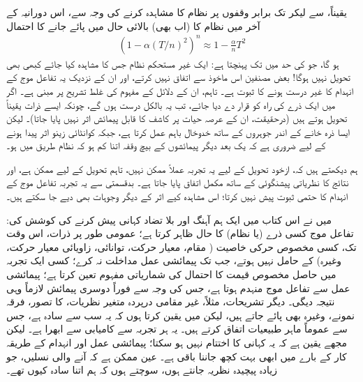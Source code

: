 یقیناً،  سے لیکر  تک  برابر وقفوں  پر نظام کا مشاہدہ کرنے کی وجہ سے، اس دورانیہ کے آخر میں نظام کا (اب بھی) بالائی حال میں پائے جانے کا احتمال 
\begin{align}
	\left(1-\alpha(T/n)^2\right)^n\approx1-\frac{\alpha}{n}T^2
\end{align}
ہو گا، جو  کی حد میں  تک پہنچتا ہے: ایک غیر مستحکم نظام جس کا  مشاہدہ کیا جائے کبھی بھی تحویل نہیں ہوگا! بعض مصنفین اس ماخوذ سے اتفاق نہیں کرتے، اور ان کے نزدیک یہ تفاعل موج کے انہدام کا غیر درست ہونے کا ثبوت ہے۔ تاہم، ان کے دلائل  کے مفہوم کی غلط تشریح پر مبنی ہے۔ اگر  میں ایک ذرے کی راہ کو  قرار دے دیا جائے، تب یہ بالکل درست ہوں گے، چونکہ ایسے ذرات یقیناً تحویل ہوتے ہیں (درحقیقت، ان کے عرصہ حیات پر کاشف کا قابل پیمائش اثر نہیں پایا جاتا)۔ لیکن ایسا ذرہ خانے کے اندر جوہروں کے ساتھ خدوخال باہم عمل کرتا ہے، جبکہ کوانٹائی زینو اثر پیدا ہونے کے لیے ضروری ہے کہ یک بعد دیگر پیمائشوں کے بیچ وقفہ اتنا کم ہو کہ نظام  طریق میں ہو۔

ہم دیکھتے ہیں کہ، ازخود تحویل کے لیے یہ تجربہ عملاً ممکن نہیں، تاہم  تحویل کے لیے ممکن ہے، اور نتائج کا نظریاتی پیشنگوئی کے ساتھ مکمل اتفاق پایا جاتا ہے۔ بدقسمتی سے یہ تجربہ تفاعل موج کے انہدام کا حتمی ثبوت پیش نہیں کرتا؛ اس مشاہدہ کیے اثر کے دیگر وجوہات بھی دیے جا سکتے ہیں۔ 

میں نے اس کتاب میں ایک ہم آہنگ اور بلا تضاد کہانی پیش کرنے کی کوشش کی: تفاعل موج  کسی ذرے (یا نظام) کا حال ظاہر کرتا ہے؛ عمومی طور پر ذرات، اس وقت تک، کسی مخصوص حرکی خاصیت ( مقام، معیار حرکت، توانائی، زاویائی معیار حرکت، وغیرہ) کے حامل نہیں ہوتے، جب تک پیمائشی عمل مداخلت نہ کرے؛ کسی ایک تجربہ میں حاصل مخصوص قیمت کا احتمال  کی شماریاتی مفہوم تعین کرتا ہے؛ پیمائشی عمل سے تفاعل موج منہدم ہوتا ہے، جس کی وجہ سے فوراً دوسری پیمائش لازماً وہی نتیجہ دیگی۔ دیگر تشریحات، مثلاً، غیر مقامی درپردہ متغیر نظریات،  کا تصور،  فرقہ نمونے، وغیرہ بھی پائے جاتے ہیں، لیکن میں یقین کرتا ہوں کہ یہ سب سے سادہ ہے، جس سے عموماً ماہر طبیعیات اتفاق کرتے ہیں۔ یہ ہر تجربہ سے کامیابی سے ابھرا ہے۔ لیکن مجھے یقین ہے کہ یہ کہانی کا اختتام نہیں ہو سکتا؛ پیمائشی عمل اور انہدام کے طریقہ کار کے بارے میں ابھی بہت کچھ جاننا باقی ہے۔ عین ممکن ہے کہ آنے والی نسلیں، جو زیادہ پیچیدہ نظریہ جانتے ہوں، سوچتے ہوں کہ ہم اتنا سادہ کیوں تھے۔

